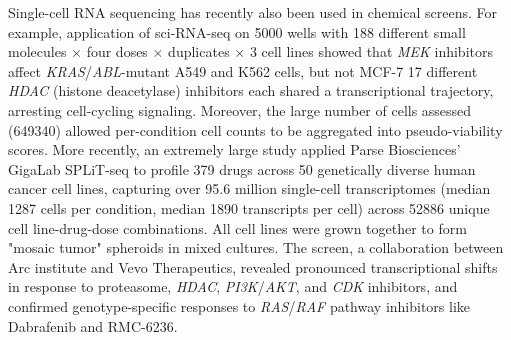 Single-cell RNA sequencing has recently also been used in chemical screens. For example, application of sci-RNA-seq on \num{5000} wells with 188 different small molecules $\times$ four doses $\times$ duplicates $\times$ 3 cell lines showed that \textit{MEK} inhibitors affect \textit{KRAS}/\textit{ABL}-mutant A549 and K562 cells, but not MCF-7 17 different \textit{HDAC} (histone deacetylase) inhibitors each shared a transcriptional trajectory, arresting cell-cycling signaling. Moreover, the large number of cells assessed (\num{649340}) allowed per-condition cell counts to be aggregated into pseudo-viability scores. More recently, an extremely large study applied Parse Biosciences' GigaLab SPLiT-seq to profile 379 drugs across 50 genetically diverse human cancer cell lines, capturing over 95.6 million single-cell transcriptomes (median \num{1287} cells per condition, median \num{1890} transcripts per cell) across \num{52886} unique cell line-drug-dose combinations. All cell lines were grown together to form "mosaic tumor" spheroids in mixed cultures. The screen, a collaboration between Arc institute and Vevo Therapeutics, revealed pronounced transcriptional shifts in response to proteasome, \textit{HDAC}, \textit{PI3K}/\textit{AKT}, and \textit{CDK} inhibitors, and confirmed genotype-specific responses to \textit{RAS}/\textit{RAF} pathway inhibitors like Dabrafenib and RMC-6236.



